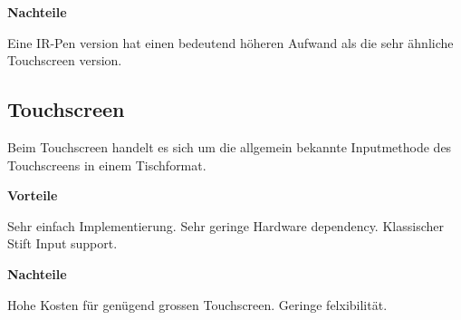 \textbf{Nachteile}

Eine IR-Pen version hat einen bedeutend höheren Aufwand als die sehr ähnliche Touchscreen version.

\subsection{Touchscreen}

Beim Touchscreen handelt es sich um die allgemein bekannte Inputmethode des Touchscreens in einem Tischformat.

\textbf{Vorteile}

Sehr einfach Implementierung.
Sehr geringe Hardware dependency.
Klassischer Stift Input support.

\textbf{Nachteile}

Hohe Kosten für genügend grossen Touchscreen.
Geringe felxibilität.
